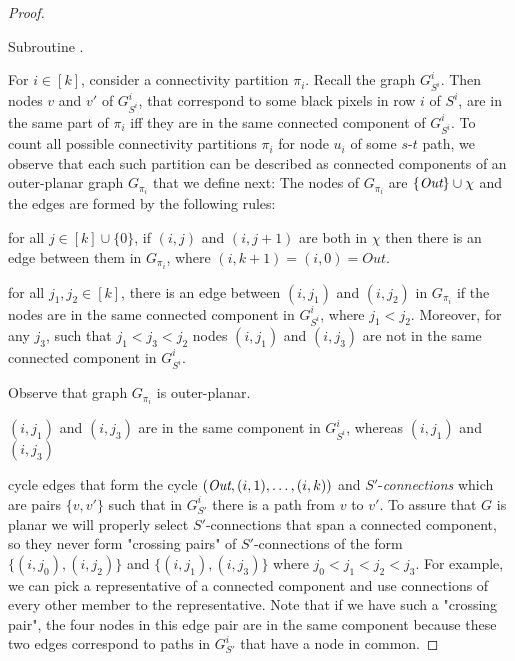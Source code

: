 \documentclass[11pt,english]{article}
\renewenvironment{enumerate}[1]{\begin{compactenum}#1}{\end{compactenum}}
\numberwithin{figure}{section}
\begin{document}
\begin{proof}
\begin{algorithm}
\caption{Subroutine \Compart.}
\label{alg:encode}
\DontPrintSemicolon
\BlankLine

\end{algorithm}






For $i\in[k]$, consider a connectivity partition $\pi_i$. Recall the graph $G^i_{S^i}$. Then nodes $v$ and $v'$ of $G^i_{S^i}$, that correspond to some black pixels in row $i$ of $S^i$, are in the same part of $\pi_i$ iff they are in the same connected component of $G^i_{S^i}$. To count all possible connectivity partitions $\pi_i$ for node $u_i$ of some $s$-$t$ path, we observe that each such partition can be described as connected components of an outer-planar graph $G_{\pi_i}$ that we define next:
The nodes of $G_{\pi_i}$ are $\{\mbox{\it Out}\}\cup\chi$ and the edges are formed by the following rules:
\begin{enumerate}
\item for all $j\in[k]\cup\{0\}$, if $(i,j)$ and $(i,j+1)$ are both in $\chi$ then there is an edge between them in $G_{\pi_i}$, where $(i,k+1)=(i,0)=Out$.
\item for all $j_1,j_2\in[k]$, there is an edge between $(i,j_1)$ and $(i,j_2)$ in $G_{\pi_i}$ if the nodes are in the same connected component in $G^i_{S^i}$, where $j_1<j_2$. Moreover, for any $j_3$, such that $j_1<j_3<j_2$ nodes $(i,j_1)$ and $(i,j_3)$ are not in the same connected component in $G^i_{S^i}$.

Observe that graph $G_{\pi_i}$ is outer-planar.


$(i,j_1)$ and $(i,j_3)$ are in the same component in $G^i_{S^i}$, whereas $(i,j_1)$ and $(i,j_3)$
\end{enumerate}
cycle edges that form the cycle $(\mbox{\it Out},(i,1),\ldots,(i,k))$ and
$S'$-{\it connections} which are
pairs $\{v,v'\}$ such that in $G^i_{S'}$ there is a path from $v$ to $v'$.
To assure that $G$ is planar we will properly select $S'$-connections
that span a connected component, so they never form
"crossing pairs" of $S'$-connections of the form
$\{(i,j_0),(i,j_2)\}$ and
$\{(i,j_1),(i,j_3)\}$ where $j_0<j_1<j_2<j_3$.  For example, we can pick
a representative of a connected component and use connections of every
other member to the representative.
Note that if we have such a "crossing pair", the four nodes in this edge
pair are in the same component because these two edges correspond to
paths in $G^i_{S'}$ that have a node in common.


\end{proof}
\end{document}
